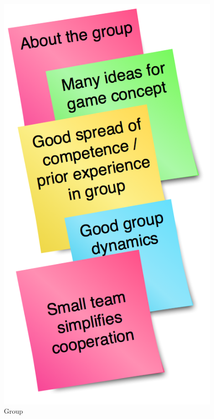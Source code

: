 \documentclass[titlepage,a4paper,11pt]{article}
\begin{document}
\begin{figure}[H]
    \begin{minipage}[b]{0.5\linewidth}
        \centering
        \includegraphics[scale=0.4]{graphics/postit/POS_about_group}
        \caption{Group}
        \label{fig:pos1}
    \end{minipage}
    \hspace{0.5cm}
    \begin{minipage}[b]{0.5\linewidth}
        \centering

\end{minipage}
\end{figure}
\end{document}
